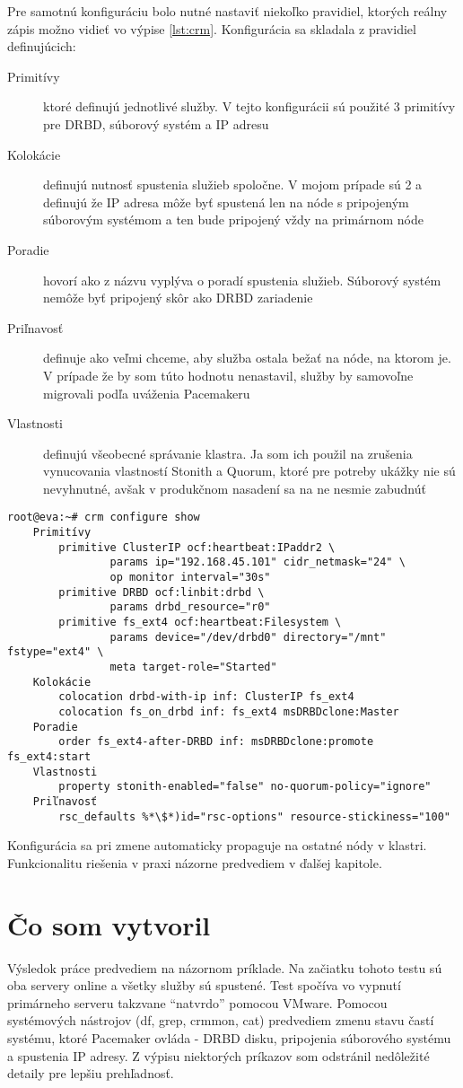 Pre samotnú konfiguráciu bolo nutné nastaviť niekoľko pravidiel, ktorých reálny zápis možno vidieť vo výpise \ref{lst:crm}. Konfigurácia sa skladala z pravidiel definujúcich:
\begin{description}
	\item[Primitívy] ktoré definujú jednotlivé služby. V tejto konfigurácii sú použité 3 primitívy pre DRBD, súborový systém a IP adresu
	\item[Kolokácie] definujú nutnosť spustenia služieb spoločne. V mojom prípade sú 2 a definujú že IP adresa môže byť spustená len na nóde s pripojeným súborovým systémom a ten bude pripojený vždy na primárnom nóde
	\item[Poradie] hovorí ako z názvu vyplýva o poradí spustenia služieb. Súborový systém nemôže byť pripojený skôr ako DRBD zariadenie
	\item[Priľnavosť] definuje ako veľmi chceme, aby služba ostala bežať na nóde, na ktorom je. V prípade že by som túto hodnotu nenastavil, služby by samovoľne migrovali podľa uváženia Pacemakeru
	\item[Vlastnosti] definujú všeobecné správanie klastra. Ja som ich použil na zrušenia vynucovania vlastností Stonith a Quorum, ktoré pre potreby ukážky nie sú nevyhnutné, avšak v produkčnom nasadení sa na ne nesmie zabudnúť
\end{description}

\begin{lstlisting}[label=lst:crm,caption=Čiastočný výpis konfigurácie crm]
root@eva:~# crm configure show
	Primitívy
		primitive ClusterIP ocf:heartbeat:IPaddr2 \
				params ip="192.168.45.101" cidr_netmask="24" \
				op monitor interval="30s"
		primitive DRBD ocf:linbit:drbd \
				params drbd_resource="r0"
		primitive fs_ext4 ocf:heartbeat:Filesystem \
				params device="/dev/drbd0" directory="/mnt" fstype="ext4" \
				meta target-role="Started"
	Kolokácie
		colocation drbd-with-ip inf: ClusterIP fs_ext4
		colocation fs_on_drbd inf: fs_ext4 msDRBDclone:Master
	Poradie
		order fs_ext4-after-DRBD inf: msDRBDclone:promote fs_ext4:start
	Vlastnosti
		property stonith-enabled="false" no-quorum-policy="ignore"
	Priľnavosť
		rsc_defaults %*\$*)id="rsc-options" resource-stickiness="100"
\end{lstlisting}

Konfigurácia sa pri zmene automaticky propaguje na ostatné nódy v klastri. Funkcionalitu riešenia v praxi názorne predvediem v ďalšej kapitole.

\section{Čo som vytvoril} %
Výsledok práce predvediem na názornom príklade. Na začiatku tohoto testu sú oba servery online a všetky služby sú spustené. Test spočíva vo vypnutí primárneho serveru takzvane "`natvrdo"' pomocou VMware. Pomocou systémových nástrojov (df, grep, crm\textunderscore mon, cat) predvediem zmenu stavu častí systému, ktoré Pacemaker ovláda - DRBD disku, pripojenia súborového systému a spustenia IP adresy. Z výpisu niektorých príkazov som odstránil nedôležité detaily pre lepšiu prehľadnosť.

